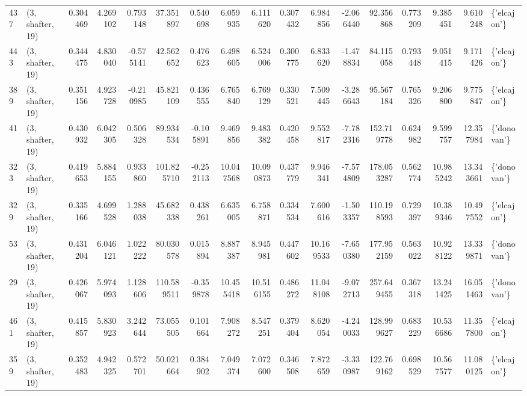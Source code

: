 \begin{tabular}{llrrrrrrrrrrrrrrl}
437 &  (3, shafter, 19) &   0.304469 &   4.269102 &   0.793148 &    37.351897 &   0.540698 &   6.059935 &   6.111620 &  0.307432 &   6.984856 &  -2.066440 &    92.356868 &   0.773209 &   9.385451 &   9.610248 &  \{'elcajon'\} \\
443 &  (3, shafter, 19) &   0.344475 &   4.830040 &  -0.575141 &    42.562652 &   0.476623 &   6.498605 &   6.524006 &  0.300775 &   6.833620 &  -1.478834 &    84.115058 &   0.793448 &   9.051415 &   9.171426 &  \{'elcajon'\} \\
389 &  (3, shafter, 19) &   0.351156 &   4.923728 &  -0.210985 &    45.821109 &   0.436555 &   6.765840 &   6.769129 &  0.330521 &   7.509445 &  -3.286643 &    95.567184 &   0.765326 &   9.206800 &   9.775847 &  \{'elcajon'\} \\
41  &  (3, shafter, 19) &   0.430932 &   6.042305 &   0.506328 &    89.934534 &  -0.105891 &   9.469856 &   9.483382 &  0.420458 &   9.552817 &  -7.782316 &   152.719778 &   0.624982 &   9.599757 &  12.357984 &  \{'donovan'\} \\
323 &  (3, shafter, 19) &   0.419653 &   5.884155 &   0.933860 &   101.825710 &  -0.252113 &  10.047568 &  10.090873 &  0.437779 &   9.946341 &  -7.574809 &   178.053287 &   0.562774 &  10.985242 &  13.343661 &  \{'donovan'\} \\
329 &  (3, shafter, 19) &   0.335166 &   4.699528 &   1.288038 &    45.682338 &   0.438261 &   6.635005 &   6.758871 &  0.334534 &   7.600616 &  -1.503357 &   110.198593 &   0.729397 &  10.389346 &  10.497552 &  \{'elcajon'\} \\
53  &  (3, shafter, 19) &   0.431204 &   6.046121 &   1.022222 &    80.030578 &   0.015894 &   8.887387 &   8.945981 &  0.447602 &  10.169533 &  -7.650380 &   177.952159 &   0.563022 &  10.928122 &  13.339871 &  \{'donovan'\} \\
29  &  (3, shafter, 19) &   0.426067 &   5.974093 &   1.128606 &   110.589511 &  -0.359878 &  10.455418 &  10.516155 &  0.486272 &  11.048108 &  -9.072713 &   257.649455 &   0.367318 &  13.241425 &  16.051463 &  \{'donovan'\} \\
461 &  (3, shafter, 19) &   0.415857 &   5.830923 &   3.242644 &    73.055505 &   0.101664 &   7.908272 &   8.547251 &  0.379404 &   8.620054 &  -4.240033 &   128.999627 &   0.683229 &  10.536686 &  11.357800 &  \{'elcajon'\} \\
359 &  (3, shafter, 19) &   0.352483 &   4.942325 &   0.572701 &    50.021664 &   0.384902 &   7.049374 &   7.072600 &  0.346508 &   7.872659 &  -3.330987 &   122.769162 &   0.698529 &  10.567577 &  11.080125 &  \{'elcajon'\} \\

\end{tabular}
